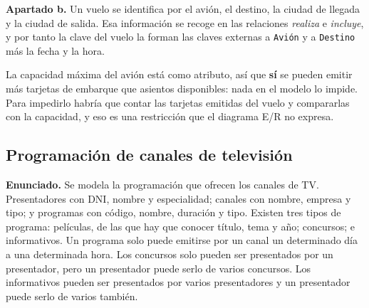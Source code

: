 \textbf{Apartado b.} Un vuelo se identifica por el avión, el destino, la ciudad
de llegada y la ciudad de salida. Esa información se recoge en las relaciones
\emph{realiza} e \emph{incluye}, y por tanto la clave del vuelo la forman las
claves externas a \texttt{Avión} y a \texttt{Destino} más la fecha y la hora.

La capacidad máxima del avión está como atributo, así que \textbf{sí} se pueden
emitir más tarjetas de embarque que asientos disponibles: nada en el modelo lo
impide. Para impedirlo habría que contar las tarjetas emitidas del vuelo y
compararlas con la capacidad, y eso es una restricción que el diagrama E/R no
expresa.

\subsection{Programación de canales de televisión}

\textbf{Enunciado.} Se modela la programación que ofrecen los canales de TV.
Presentadores con DNI, nombre y especialidad; canales con nombre, empresa y
tipo; y programas con código, nombre, duración y tipo. Existen tres tipos de
programa: películas, de las que hay que conocer título, tema y año; concursos; e
informativos. Un programa solo puede emitirse por un canal un determinado día a
una determinada hora. Los concursos solo pueden ser presentados por un
presentador, pero un presentador puede serlo de varios concursos. Los
informativos pueden ser presentados por varios presentadores y un presentador
puede serlo de varios también.


